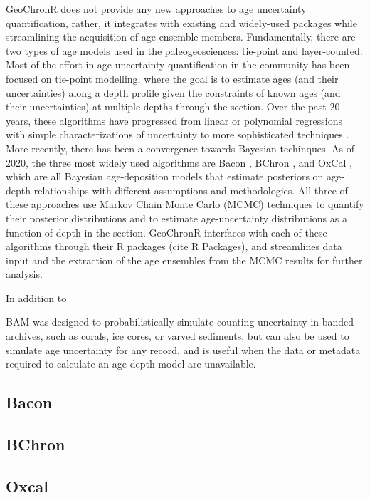 \documentclass[gc, manuscript]{copernicus}
\begin{document}
GeoChronR does not provide any new approaches to age uncertainty quantification, rather, it integrates with existing and widely-used packages while streamlining the acquisition of age ensemble members.
Fundamentally, there are two types of age models used in the paleogeosciences: tie-point and layer-counted.
Most of the effort in age uncertainty quantification in the community has been focused on tie-point modelling, where the goal is to estimate ages (and their uncertainties) along a depth profile given the constraints of known ages (and their uncertainties) at multiple depths through the section.
Over the past 20 years, these algorithms have progressed from linear or polynomial regressions with simple characterizations of uncertainty to more sophisticated techniques \citep[\citet{heegaard05}]{clam}.
More recently, there has been a convergence towards Bayesian techinques.
As of 2020, the three most widely used algorithms are Bacon \citep{bacon}, BChron \citep{parnell2008flexible}, and OxCal \citep{ramsey2008deposition}, which are all Bayesian age-deposition models that estimate posteriors on age-depth relationships with different assumptions and methodologies.
All three of these approaches use Markov Chain Monte Carlo (MCMC) techniques to quantify their posterior distributions and to estimate age-uncertainty distributions as a function of depth in the section.
GeoChronR interfaces with each of these algorithms through their R packages (cite R Packages), and streamlines data input and the extraction of the age ensembles from the MCMC results for further analysis.

In addition to

BAM \citep{BAM} was designed to probabilistically simulate counting uncertainty in banded archives, such as corals, ice cores, or varved sediments, but can also be used to simulate age uncertainty for any record, and is useful when the data or metadata required to calculate an age-depth model are unavailable.

\subsection{Bacon}

\subsection{BChron}

\subsection{Oxcal}
\end{document}
